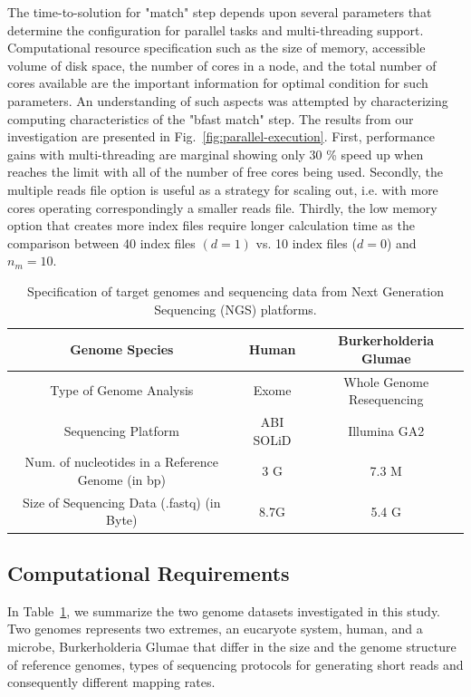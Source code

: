 \documentclass[12pt]{article}
\begin{document}
The time-to-solution for "match" step depends upon several parameters that determine the configuration for parallel tasks and multi-threading support.  Computational resource specification such as the size of memory, accessible volume of disk space, the number of cores in a node, and the total number of cores available are the important information for optimal condition for such parameters.  An understanding of such aspects was attempted by characterizing computing characteristics of the "bfast match" step.  The results from our investigation are presented  in Fig.~\ref{fig:parallel-execution}. First, performance gains with multi-threading are marginal showing only 30 \% speed up when reaches the limit with all of the number of free cores being used.  
Secondly, the multiple reads file option is useful as a strategy for scaling out, i.e. with more cores operating correspondingly a smaller reads file.  Thirdly, the low memory option that creates more index files require longer calculation time as the comparison between 40 index files $(d = 1)$ vs. 10 index files ($ d = 0 $) and $n_m = 10$.   





\begin{table}
\begin{tabular}{|c|cc|} 
  \hline 
  Genome Species & Human  & Burkerholderia Glumae  \\ \hline
  Type of Genome Analysis &  Exome  & Whole Genome Resequencing \\
  Sequencing Platform & ABI SOLiD  &  Illumina GA2 \\
  Num. of nucleotides in a Reference Genome (in bp) &  3 G & 7.3 M \\
  Size of Sequencing Data (.fastq) (in Byte) & 8.7G & 5.4 G \\

\hline
\end{tabular} \caption{Specification of target genomes and sequencing data from Next Generation Sequencing (NGS) platforms.}
 \label{table:two-genomes} 
\end{table}

\subsection{Computational Requirements}


In Table~\ref{table:two-genomes}, we summarize the two genome datasets investigated in this study. Two genomes represents two extremes, an eucaryote system, human, and a microbe, Burkerholderia Glumae\cite{kim2011} that differ in the size and the genome structure of reference genomes, types of sequencing protocols for generating short reads and consequently different mapping rates.
\end{document}
